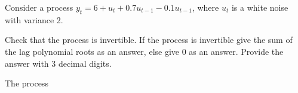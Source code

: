 
\begin{question}
Consider a process \(y_t = 6 + u_t + 0.7 u_{t-1} - 0.1 u_{t-1}\), where \(u_t\) is a white noise with variance 2.

Check that the process is invertible. If the process is invertible give the sum of the lag polynomial roots as an answer, else give 0 as an answer.
Provide the answer with 3 decimal digits.
\end{question}

\begin{solution}
The process
\end{solution}

